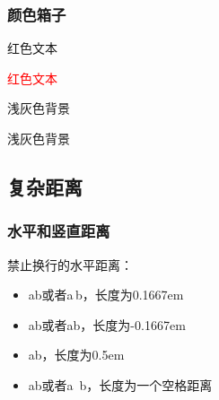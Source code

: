 \documentclass{ctexart}
\begin{document}
        \subsubsection{颜色箱子}
            {\color{red}红色文本}
            
            \textcolor{red}{红色文本}

            \colorbox[gray]{.95}{浅灰色背景}



            {\setlength{\fboxrule}{1pt}
            \setlength{\fboxsep}{0pt}
            \colorbox[gray]{.95}{浅灰色背景}

            }

    \subsection{复杂距离}
        \subsubsection{水平和竖直距离}
            禁止换行的水平距离：
            \begin{itemize}
                \item a\thinspace b或者a\,b，长度为0.1667em
                \item a\negthinspace b或者a\!b，长度为-0.1667em
                \item a\enspace b，长度为0.5em
                \item a\nobreakspace b或者a~b，长度为一个空格距离
            \end{itemize}
\end{document}
